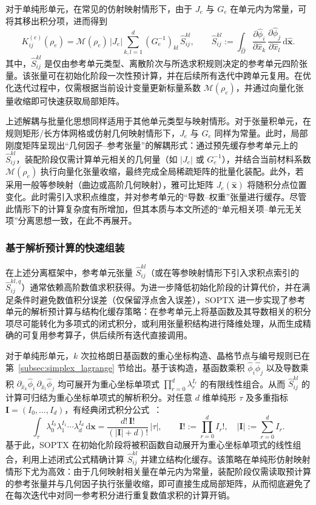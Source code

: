 对于单纯形单元，在常见的仿射映射情形下，由于 $J_e$ 与 $G_e$ 在单元内为常量，可将其移出积分项，进而得到
\[
K^{(e)}_{ij}(\rho_e) = \mathcal{M}(\rho_e) \, |J_e| \sum_{k,l=1}^{d}(G_e^{-1})_{kl}\,\hat{S}^{kl}_{ij}, \qquad \hat{S}^{kl}_{ij}:=\int_{\hat{\Omega}} \frac{\partial \hat{\phi}_i}{\partial \hat{x}_k}\, \frac{\partial \hat{\phi}_j}{\partial \hat{x}_l}\, \mathrm d\hat{\boldsymbol{x}}.
\]
其中，$\hat{S}^{kl}_{ij}$ 是仅由参考单元类型、离散阶次与所选求积规则决定的参考单元四阶张量。该张量可在初始化阶段一次性预计算，并在后续所有迭代中跨单元复用。在优化迭代过程中，仅需根据当前设计变量更新标量系数 $\mathcal{M}(\rho_e)$，并通过向量化张量收缩即可快速获取局部矩阵。

上述解耦与批量化思想同样适用于其他单元类型与映射情形。对于张量积单元，在规则矩形/长方体网格或仿射几何映射情形下，$J_e$ 与 $G_e$ 同样为常量。此时，局部刚度矩阵呈现出“几何因子--参考张量”的解耦形式：通过预先缓存参考单元上的 $\hat{S}_{ij}^{kl}$，装配阶段仅需计算单元相关的几何量（如 $|J_e|$ 或 $G_e^{-1}$），并结合当前材料系数 $\mathcal{M}(\rho_e)$ 执行向量化张量收缩，最终完成全局稀疏矩阵的批量化装配。此外，若采用一般等参映射（曲边或高阶几何映射），雅可比矩阵 $J_e(\hat{\boldsymbol{x}})$ 将随积分点位置变化。此时需引入求积点维度，并对参考单元的“导数--权重”张量进行缓存。尽管此情形下的计算复杂度有所增加，但其本质与本文所述的“单元相关项--单元无关项”分离思想一致，在此不再展开。

\subsubsection*{基于解析预计算的快速组装}

在上述分离框架中，参考单元张量 $\hat{S}^{kl}_{ij}$（或在等参映射情形下引入求积点索引的 $\hat{S}^{kl,q}_{ij}$）通常依赖高阶数值求积获得。为进一步降低初始化阶段的计算代价，并在满足条件时避免数值积分误差（仅保留浮点舍入误差），SOPTX 进一步实现了参考单元的解析预计算与结构化缓存策略：在参考单元上将基函数及其导数相关的积分项尽可能转化为多项式的闭式积分，或利用张量积结构进行降维处理，从而生成精确的可复用参考算子，供后续所有迭代直接调用。

对于单纯形单元，$k$ 次拉格朗日基函数的重心坐标构造、晶格节点与编号规则已在第~\ref{subsec:simplex_lagrange} 节给出。基于该构造，基函数乘积 $\hat{\phi}_i\hat{\phi}_j$ 以及导数乘积 $\partial_{\hat{x}_k}\hat{\phi}_i\,\partial_{\hat{x}_l}\hat{\phi}_j$ 均可展开为重心坐标单项式 $\prod_{r=0}^{d}\lambda_r^{I_r}$ 的有限线性组合。从而 $\hat{S}^{kl}_{ij}$ 的计算可归结为重心坐标单项式的解析积分。对任意 $d$ 维单纯形 $\tau$ 及多重指标 $\boldsymbol{I}=(I_0,\dots,I_d)$，有经典闭式积分公式~\cite{vermolenIntegrationRuleProducts2018}：
\[
\int_{\tau}\lambda_0^{I_0}\lambda_1^{I_1}\cdots \lambda_d^{I_d}\,\mathrm d\boldsymbol{x} =\frac{d!\,\boldsymbol{I}!}{(|\boldsymbol{I}|+d)!}\,|\tau|, \qquad \boldsymbol{I}!:=\prod_{r=0}^{d}I_r!,\quad |\boldsymbol{I}|:=\sum_{r=0}^{d}I_r.
\]
基于此，SOPTX 在初始化阶段将被积函数自动展开为重心坐标单项式的线性组合，利用上述闭式公式精确计算 $\hat{S}_{ij}^{kl}$ 并建立结构化缓存。该策略在单纯形仿射映射情形下尤为高效：由于几何映射相关量在单元内为常量，装配阶段仅需读取预计算的参考张量并与几何因子执行张量收缩，即可直接生成局部矩阵，从而彻底避免了在每次迭代中对同一参考积分进行重复数值求积的计算开销。

